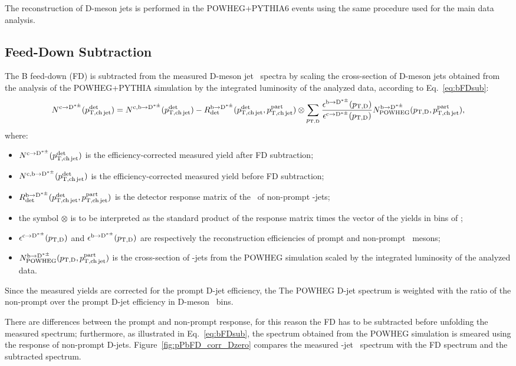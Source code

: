 The reconstruction of D-meson jets is performed in the POWHEG+PYTHIA6 events using the same procedure used for the main data analysis.

\subsection{Feed-Down Subtraction}
The B feed-down (FD) is subtracted from the measured D-meson jet \pt\ spectra by scaling the cross-section of D-meson jets obtained from the analysis of the POWHEG+PYTHIA simulation by the integrated luminosity of the analyzed data, according to Eq.~\ref{eq:bFDsub}:
\begin{equation}
N^{\rm c\rightarrow\mathrm{D^{*\pm}}}(p_{\mathrm{T,ch\,jet}}^{\mathrm{det}}) = 
N^{\rm c,b\rightarrow\mathrm{D^{*\pm}}}(p_{\mathrm{T,ch\,jet}}^{\mathrm{det}}) - 
R_{\rm det}^{\rm b\rightarrow\mathrm{D^{*\pm}}}(p_{\mathrm{T,ch\,jet}}^{\mathrm{det}},p_{\mathrm{T,ch\,jet}}^{\mathrm{part}}) \otimes \sum_{p_{\mathrm{T,D}}} \frac{\epsilon^{\rm b\rightarrow\mathrm{D^{*\pm}}}(p_{\mathrm{T,D}})}{\epsilon^{\rm c\rightarrow\mathrm{D^{*\pm}}}(p_{\mathrm{T,D}})} N^{\rm b\rightarrow\mathrm{D^{*\pm}}}_{\rm POWHEG}(p_{\mathrm{T,D}},p_{\mathrm{T,ch\,jet}}^{\mathrm{part}}),
\label{eq:bFDsub}
\end{equation}
where:
\begin{itemize}
\item $N^{\rm c\rightarrow\mathrm{D^{*\pm}}}(p_{\mathrm{T,ch\,jet}}^{\mathrm{det}})$ is the efficiency-corrected measured yield after FD subtraction; 
\item $N^{\rm c,b\rightarrow\mathrm{D^{*\pm}}}(p_{\mathrm{T,ch\,jet}}^{\mathrm{det}})$ is the efficiency-corrected measured yield before FD subtraction;
\item $R_{\rm det}^{\rm b\rightarrow\mathrm{D^{*\pm}}}(p_{\mathrm{T,ch\,jet}}^{\mathrm{det}},p_{\mathrm{T,ch\,jet}}^{\mathrm{part}})$ is the detector response matrix of the \pt\ of non-prompt \Dzero-jets;
\item the symbol $\otimes$ is to be interpreted as the standard product of the response matrix times the vector of the yields in bins of \ptchjetgen;
\item $\epsilon^{\rm c\rightarrow\mathrm{D^{*\pm}}}(p_{\mathrm{T,D}})$ and $\epsilon^{\rm b\rightarrow\mathrm{D^{*\pm}}}(p_{\mathrm{T,D}})$ are respectively the reconstruction efficiencies of prompt and non-prompt \Dzero\ mesons;
\item $N^{\rm b\rightarrow\mathrm{D^{*\pm}}}_{\rm POWHEG}(p_{\mathrm{T,D}},p_{\mathrm{T,ch\,jet}}^{\mathrm{part}})$ is the cross-section of \Dstar-jets from the POWHEG simulation scaled by the integrated luminosity of the analyzed data.
\end{itemize}
Since the measured yields are corrected for the prompt D-jet efficiency, the The POWHEG D-jet spectrum is weighted with the ratio of the non-prompt over the prompt D-jet efficiency in D-meson \pt\ bins.

There are differences between the prompt and non-prompt response, for this reason the FD has to be subtracted before unfolding the measured spectrum; furthermore, as illustrated in Eq.~\ref{eq:bFDsub}, the spectrum obtained from the POWHEG simulation is smeared using the response of non-prompt D-jets. 
Figure~\ref{fig:pPbFD_corr_Dzero} compares the measured \Dzero-jet \pt\ spectrum with the FD spectrum and the subtracted spectrum.


